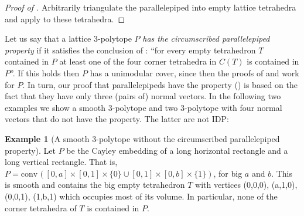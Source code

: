 \documentclass{amsart}
\theoremstyle{plain}
\theoremstyle{definition}
\newtheorem{example}[theorem]{Example}
\newtheorem{remark}[theorem]{Remark}
\newcommand{\R}{ \ensuremath{\mathbb{R}}}
\newcommand{\conv}{\ensuremath{\mathrm{conv}}\hspace{1pt}}
\begin{document}
\begin{proof}[Proof of ]
Arbitrarily triangulate the parallelepiped into empty lattice tetrahedra and apply  to these tetrahedra.
%
%
\end{proof}




Let us say that a lattice $3$-polytope $P$ \emph{has the circumscribed parallelepiped property} if it satisfies the conclusion of :  ``for every empty tetrahedron $T$ contained in $P$ at least one of the four corner tetrahedra in $C(T)$ is 
contained in $P$''. 
If this holds then $P$ has a unimodular cover, since then the proofs of  and  work for $P$.
In turn, our proof that parallelepipeds have the property () is based on the fact that they have only three (pairs of) normal vectors. 
In the following two examples we show a smooth $3$-polytope and two $3$-polytope with four normal vectors that do not have the property. The latter are not IDP:



\begin{example}[A smooth 3-polytope without the circumscribed parallelepiped property]
 Let $P$ be the Cayley embedding of a long horizontal rectangle and a long vertical rectangle. That is,
$P=\conv([0,a]\times [0,1] \times\{0\} \cup [0,1]\times [0,b] \times\{1\})$, for big $a$ and $b$. This is smooth and contains the big empty tetrahedron $T$ with vertices (0,0,0), (a,1,0), (0,0,1), (1,b,1) which occupies most of its volume. In particular, none of the corner tetrahedra of $T$ is contained in $P$.
\end{example}
\end{document}
